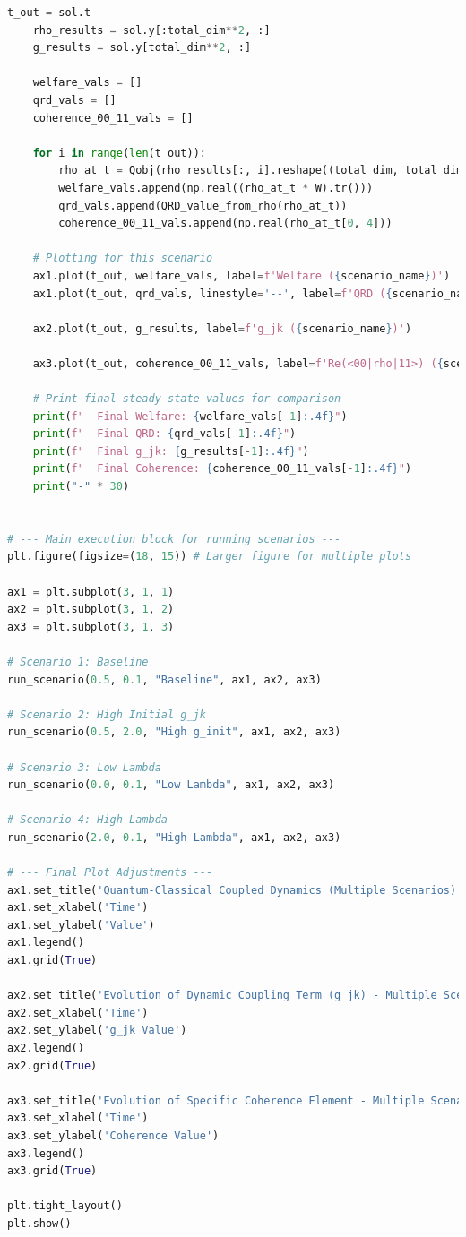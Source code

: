 \documentclass[9pt]{article}
\begin{document}
\begin{lstlisting}[language=Python, basicstyle=\ttfamily\footnotesize, breaklines=true, frame=single, caption={Python Code for Quantum-Classical Coupled Unbounded Dynamics}, label={lst:qrd_code}]
    t_out = sol.t
    rho_results = sol.y[:total_dim**2, :]
    g_results = sol.y[total_dim**2, :]

    welfare_vals = []
    qrd_vals = []
    coherence_00_11_vals = []

    for i in range(len(t_out)):
        rho_at_t = Qobj(rho_results[:, i].reshape((total_dim, total_dim)), dims=[Ns, Ns])
        welfare_vals.append(np.real((rho_at_t * W).tr()))
        qrd_vals.append(QRD_value_from_rho(rho_at_t))
        coherence_00_11_vals.append(np.real(rho_at_t[0, 4]))

    # Plotting for this scenario
    ax1.plot(t_out, welfare_vals, label=f'Welfare ({scenario_name})')
    ax1.plot(t_out, qrd_vals, linestyle='--', label=f'QRD ({scenario_name})')

    ax2.plot(t_out, g_results, label=f'g_jk ({scenario_name})')
    
    ax3.plot(t_out, coherence_00_11_vals, label=f'Re(<00|rho|11>) ({scenario_name})')

    # Print final steady-state values for comparison
    print(f"  Final Welfare: {welfare_vals[-1]:.4f}")
    print(f"  Final QRD: {qrd_vals[-1]:.4f}")
    print(f"  Final g_jk: {g_results[-1]:.4f}")
    print(f"  Final Coherence: {coherence_00_11_vals[-1]:.4f}")
    print("-" * 30)


# --- Main execution block for running scenarios ---
plt.figure(figsize=(18, 15)) # Larger figure for multiple plots

ax1 = plt.subplot(3, 1, 1)
ax2 = plt.subplot(3, 1, 2)
ax3 = plt.subplot(3, 1, 3)

# Scenario 1: Baseline
run_scenario(0.5, 0.1, "Baseline", ax1, ax2, ax3)

# Scenario 2: High Initial g_jk
run_scenario(0.5, 2.0, "High g_init", ax1, ax2, ax3)

# Scenario 3: Low Lambda
run_scenario(0.0, 0.1, "Low Lambda", ax1, ax2, ax3)

# Scenario 4: High Lambda
run_scenario(2.0, 0.1, "High Lambda", ax1, ax2, ax3)

# --- Final Plot Adjustments ---
ax1.set_title('Quantum-Classical Coupled Dynamics (Multiple Scenarios)')
ax1.set_xlabel('Time')
ax1.set_ylabel('Value')
ax1.legend()
ax1.grid(True)

ax2.set_title('Evolution of Dynamic Coupling Term (g_jk) - Multiple Scenarios')
ax2.set_xlabel('Time')
ax2.set_ylabel('g_jk Value')
ax2.legend()
ax2.grid(True)

ax3.set_title('Evolution of Specific Coherence Element - Multiple Scenarios')
ax3.set_xlabel('Time')
ax3.set_ylabel('Coherence Value')
ax3.legend()
ax3.grid(True)

plt.tight_layout()
plt.show()
\end{lstlisting}
\end{document}
